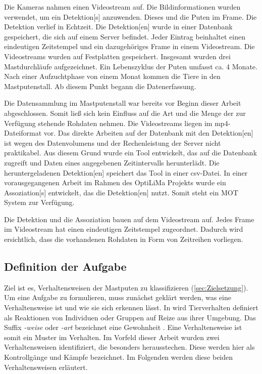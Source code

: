 Die Kameras nahmen einen Videostream auf. Die Bildinformationen wurden verwendet, um ein \gls{Detektion}[s] anzuwenden. Dieses  und  die Puten im \gls{Frame}. Die \gls{Detektion} verlief in Echtzeit. Die \gls{Detektion}[en] wurde in einer Datenbank gespeichert, die sich auf einem Server befindet. Jeder Eintrag beinhaltet einen eindeutigen Zeitstempel und ein dazugehöriges \gls{Frame} in einem Videostream. Die Videostreams wurden auf Festplatten gespeichert. Insgesamt wurden  drei Mastdurchläufe aufgezeichnet. Ein Lebenszyklus der Puten umfasst ca. 4 Monate. Nach einer Aufzuchtphase von einem Monat kommen die Tiere in den Mastputenstall. Ab diesem Punkt begann die Datenerfassung. \par

Die Datensammlung im Mastputenstall war bereits vor Beginn dieser Arbeit abgeschlossen. Somit ließ sich kein Einfluss auf die Art und die Menge der zur Verfügung stehende Rohdaten nehmen. Die Videostreams liegen im mp4-Dateiformat vor. Das direkte Arbeiten auf der Datenbank mit den \gls{Detektion}[en] ist wegen des Datenvolumens und der Rechenleistung der Server nicht praktikabel. Aus diesem Grund wurde ein Tool entwickelt, das auf die Datenbank zugreift und Daten eines angegebenen Zeitintervalls herunterlädt. Die heruntergeladenen \gls{Detektion}[en] speichert das Tool in einer csv-Datei. In einer vorausgegangenen Arbeit im Rahmen des \acrshort{OptiLiMa} Projekts wurde ein \gls{Assoziation}[s] entwickelt, das die \gls{Detektion}[en] nutzt. Somit steht ein \gls{MOT} System zur Verfügung. \par

Die \gls{Detektion} und die \gls{Assoziation} bauen auf dem Videostream auf. Jedes \gls{Frame} im Videostream hat einen eindeutigen Zeitstempel zugeordnet. Dadurch wird ersichtlich, dass die vorhandenen Rohdaten in Form von Zeitreihen vorliegen.

\subsection{Definition der Aufgabe} \label{sec:Meth DefAufgabe}
Ziel ist es, Verhaltensweisen der Mastputen zu klassifizieren (\autoref{sec:Zielsetzung}). Um eine Aufgabe zu formulieren, muss zunächst geklärt werden, was eine Verhaltensweise ist und wie sie sich erkennen lässt. In \cite{Levitis.2009} wird Tierverhalten definiert als Reaktionen von Individuen oder Gruppen auf Reize aus ihrer Umgebung. Das Suffix \textit{-weise} oder \textit{-art} bezeichnet eine Gewohnheit \cite{duden.art}. Eine Verhaltensweise ist somit ein Muster im Verhalten. Im Vorfeld dieser Arbeit wurden zwei Verhaltensweisen identifiziert, die besonders herausstechen. Diese werden hier als Kontrollgänge und Kämpfe bezeichnet. Im Folgenden werden diese beiden Verhaltensweisen erläutert. \dubpar

